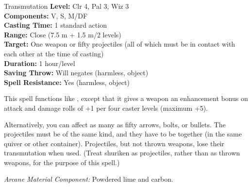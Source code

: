 {Transmutation}
{
	\textbf{Level:}
	Clr 4, Pal 3, Wiz 3\\
	\textbf{Components:}
	V, S, M/DF\\
	\textbf{Casting Time:}
	1 standard action\\
	\textbf{Range:}
	Close (7.5 m + 1.5 m/2 levels)\\
	\textbf{Target:}
	One weapon or fifty projectiles (all of which must be in contact with each other at the time of casting)\\
	\textbf{Duration:}
	1 hour/level\\
	\textbf{Saving Throw:}
	Will negates (harmless, object)\\
	\textbf{Spell Resistance:}
	Yes (harmless, object)\\
}
{
	This spell functions like , except that it gives a weapon an enhancement bonus on attack and damage rolls of +1 per four caster levels (maximum +5).

	Alternatively, you can affect as many as fifty arrows, bolts, or bullets. The projectiles must be of the same kind, and they have to be together (in the same quiver or other container). Projectiles, but not thrown weapons, lose their transmutation when used. (Treat shuriken as projectiles, rather than as thrown weapons, for the purpose of this spell.)

	\textit{Arcane Material Component:}
	Powdered lime and carbon.

}
